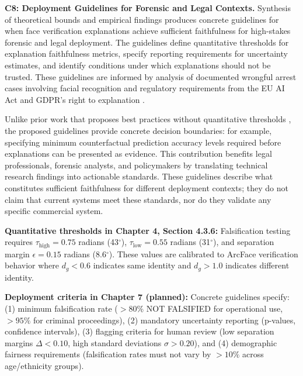 \vspace{0.5cm}

\textbf{C8: Deployment Guidelines for Forensic and Legal Contexts.} Synthesis of theoretical bounds and empirical findings produces concrete guidelines for when face verification explanations achieve sufficient faithfulness for high-stakes forensic and legal deployment. The guidelines define quantitative thresholds for explanation faithfulness metrics, specify reporting requirements for uncertainty estimates, and identify conditions under which explanations should not be trusted. These guidelines are informed by analysis of documented wrongful arrest cases involving facial recognition \cite{hill2020detroit,hill2023pregnant} and regulatory requirements from the EU AI Act and GDPR's right to explanation \cite{euaiact2024,gdpr2016}.

Unlike prior work that proposes best practices without quantitative thresholds \cite{raji2020closing}, the proposed guidelines provide concrete decision boundaries: for example, specifying minimum counterfactual prediction accuracy levels required before explanations can be presented as evidence. This contribution benefits legal professionals, forensic analysts, and policymakers by translating technical research findings into actionable standards. These guidelines describe what constitutes sufficient faithfulness for different deployment contexts; they do not claim that current systems meet these standards, nor do they validate any specific commercial system.

\vspace{0.3cm}
\noindent\textbf{Quantitative thresholds in Chapter 4, Section 4.3.6:} Falsification testing requires $\tau_{\text{high}} = 0.75$ radians (43$^\circ$), $\tau_{\text{low}} = 0.55$ radians (31$^\circ$), and separation margin $\epsilon = 0.15$ radians (8.6$^\circ$). These values are calibrated to ArcFace verification behavior where $d_g < 0.6$ indicates same identity and $d_g > 1.0$ indicates different identity.

\vspace{0.3cm}
\noindent\textbf{Deployment criteria in Chapter 7 (planned):} Concrete guidelines specify: (1) minimum falsification rate ($>80\%$ NOT FALSIFIED for operational use, $>95\%$ for criminal proceedings), (2) mandatory uncertainty reporting (p-values, confidence intervals), (3) flagging criteria for human review (low separation margins $\Delta < 0.10$, high standard deviations $\sigma > 0.20$), and (4) demographic fairness requirements (falsification rates must not vary by $>10\%$ across age/ethnicity groups).

